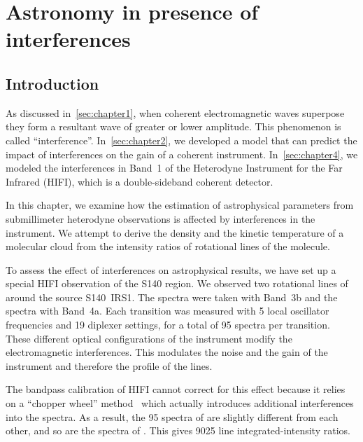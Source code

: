 \cleardoublepage
\chapter{Astronomy in presence of interferences}
\label{sec:chapter5}

\section{Introduction}

As discussed in~\cref{sec:chapter1}, when coherent electromagnetic waves superpose they form a resultant wave of greater or lower amplitude.
This phenomenon is called ``interference''.
In~\cref{sec:chapter2}, we developed a model that can predict the impact of interferences on the gain of a coherent instrument.
In~\cref{sec:chapter4}, we modeled the interferences in Band~1 of the Heterodyne Instrument for the Far Infrared (HIFI), which is a double-sideband coherent detector.

In this chapter, we examine how the estimation of astrophysical parameters from submillimeter heterodyne observations is affected by interferences in the instrument.
We attempt to derive the density and the kinetic temperature of a molecular cloud from the intensity ratios of rotational lines of the  molecule.

To assess the effect of interferences on astrophysical results, we have set up a special HIFI observation of the S140 region.
We observed two rotational lines of~ around the source S140~IRS1.
The  spectra were taken with Band~3b and the  spectra with Band~4a.
Each transition was measured with 5 local oscillator frequencies and 19 diplexer settings, for a total of 95 spectra per transition.
These different optical configurations of the instrument modify the electromagnetic interferences.
This modulates the noise and the gain of the instrument and therefore the profile of the lines.

The bandpass calibration of HIFI cannot correct for this effect because it relies on a ``chopper wheel'' method~\parencite{kutner1981recommendations,ossenkopf2002intensity} which actually introduces additional interferences into the spectra.
As a result, the 95 spectra of  are slightly different from each other, and so are the spectra of .
This gives 9025 line integrated-intensity ratios.

